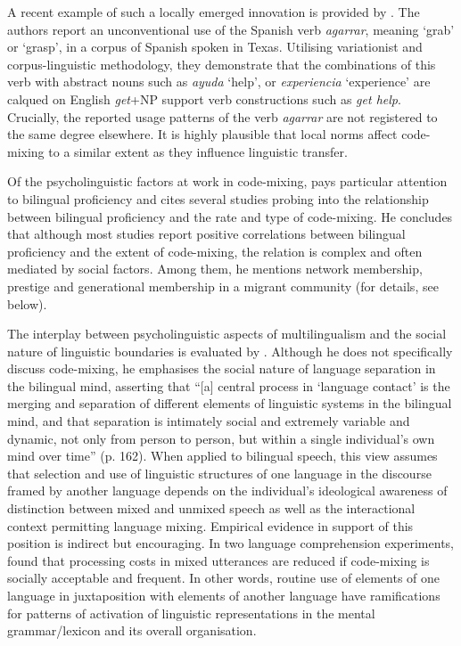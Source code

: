 A recent example of such a locally emerged innovation is provided by \citet[][]{bullock-serigos-toribio}. The authors report an unconventional use of the Spanish verb \textit{agarrar}, meaning `grab' or `grasp', in a corpus of Spanish spoken in Texas. Utilising variationist and corpus-linguistic methodology, they demonstrate that the combinations of this verb with abstract nouns such as \textit{ayuda} `help', or \textit{experiencia} `experience' are calqued on English \textit{get}+NP support verb constructions such as \textit{get help}. Crucially, the reported usage patterns of the verb \textit{agarrar} are not registered to the same degree elsewhere. It is highly plausible that local norms affect code-mixing to a similar extent as they influence linguistic transfer.

Of the psycholinguistic factors at work in code-mixing, \citet[][224--227]{muysken-bilingual-2000} pays particular attention to bilingual proficiency and cites several studies probing into the relationship between bilingual proficiency and the rate and type of code-mixing. He concludes that although most studies report positive correlations between bilingual proficiency and the extent of code-mixing, the relation is complex and often mediated by social factors. Among them, he mentions network membership, prestige and generational membership in a migrant community (for details, see below).

The interplay between psycholinguistic aspects of multilingualism and the social nature of linguistic boundaries is evaluated by \citet{law-14}. Although he does not specifically discuss code-mixing, he emphasises the social nature of language separation in the bilingual mind, asserting that ``[a] central process in `language contact' is the merging and separation of different elements of linguistic systems in the bilingual mind, and that separation is intimately social and extremely variable and dynamic, not only from person to person, but within a single individual’s own mind over time'' (p. 162). When applied to bilingual speech, this view assumes that selection and use of linguistic structures of one language in the discourse framed by another language depends on the individual's ideological awareness of distinction between mixed and unmixed speech as well as the interactional context permitting language mixing. Empirical evidence in support of this position is indirect but encouraging. In two language comprehension experiments, \citet{adamou-shen} found that processing costs in mixed utterances are reduced if code-mixing is socially acceptable and frequent. In other words, routine use of elements of one language in juxtaposition with elements of another language have ramifications for patterns of activation of linguistic representations in the mental grammar/lexicon and its overall organisation.

